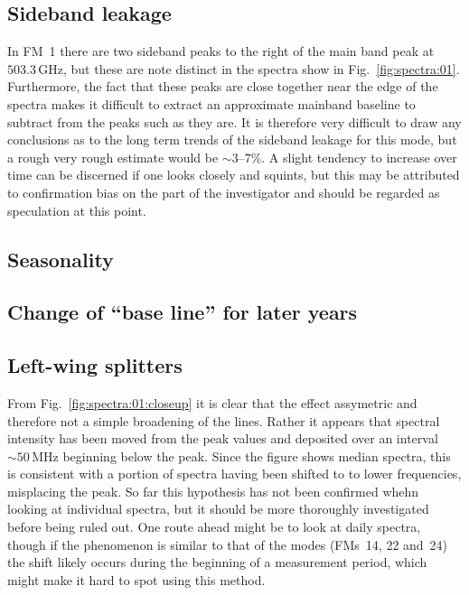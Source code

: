 \subsection{Sideband leakage}
\label{FM01:sbl}
In FM~1 there are two sideband peaks to the right of the main band peak at
$503.3\,\mathrm{GHz}$, but these are note distinct in the spectra show in
Fig.~\ref{fig:spectra:01}.  Furthermore, the fact that these peaks are close
together near the edge of the spectra makes it difficult to extract an
approximate mainband baseline to subtract from the peaks such as they are.  It
is therefore very difficult to draw any conclusions as to the long term trends
of the sideband leakage for this mode, but a rough very rough estimate would be
$\sim3$--$7$\%.  A slight tendency to increase over time can be discerned if
one looks closely and squints, but this may be attributed to confirmation bias
on the part of the investigator and should be regarded as speculation at this
point.


\subsection{Seasonality}
\label{FM01:seasonality}

\subsection{Change of ``base line'' for later years}
\label{FM01:baseline}

\subsection{Left-wing splitters}
\label{FM01:leftwings}
From Fig.~\ref{fig:spectra:01:closeup} it is clear that the effect assymetric
and therefore not a simple broadening of the lines.
Rather it appears that spectral intensity has been moved from the peak values
and deposited over an interval $\sim50\,\mathrm{MHz}$ beginning below the peak.
Since the figure shows median spectra, this is consistent with a portion of
spectra having been shifted to to lower frequencies, misplacing the peak.  So
far this hypothesis has not been confirmed whehn looking at individual spectra,
but it should be more thoroughly investigated before being ruled out.  One
route ahead might be to look at daily spectra, though if the phenomenon is
similar to that of the  modes (FMs~14, 22 and~24) the shift likely
occurs during the beginning of a measurement period, which might make it hard
to spot using this method.

